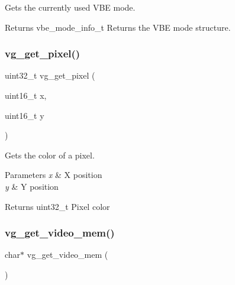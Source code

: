 Gets the currently used V\+BE mode. 

\begin{DoxyReturn}{Returns}
vbe\+\_\+mode\+\_\+info\+\_\+t Returns the V\+BE mode structure. 
\end{DoxyReturn}
\mbox{\label{group__video_ga205ab9910f679634b489672fa90212c3}} 
\subsubsection{\texorpdfstring{vg\+\_\+get\+\_\+pixel()}{vg\_get\_pixel()}}
{\footnotesize\ttfamily uint32\+\_\+t vg\+\_\+get\+\_\+pixel (\begin{DoxyParamCaption}\item[{uint16\+\_\+t}]{x,  }\item[{uint16\+\_\+t}]{y }\end{DoxyParamCaption})}



Gets the color of a pixel. 


\begin{DoxyParams}{Parameters}
{\em x} & X position \\
\hline
{\em y} & Y position \\
\hline
\end{DoxyParams}
\begin{DoxyReturn}{Returns}
uint32\+\_\+t Pixel color 
\end{DoxyReturn}
\mbox{\label{group__video_ga0cd2b85b0088ab47b2b7bb6c135ad4b1}} 
\subsubsection{\texorpdfstring{vg\+\_\+get\+\_\+video\+\_\+mem()}{vg\_get\_video\_mem()}}
{\footnotesize\ttfamily char$\ast$ vg\+\_\+get\+\_\+video\+\_\+mem (\begin{DoxyParamCaption}{ }\end{DoxyParamCaption})}

